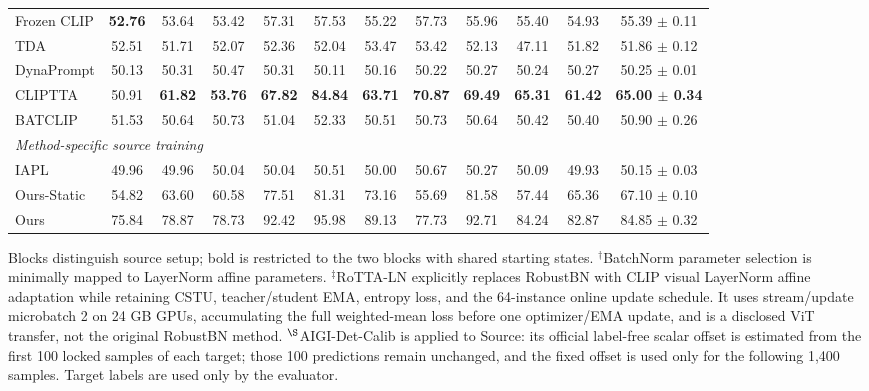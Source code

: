 \begin{table}[t]
{\begin{tabular}{lccccccccccc}
Frozen CLIP & \textbf{52.76} & 53.64 & 53.42 & 57.31 & 57.53 & 55.22 & 57.73 & 55.96 & 55.40 & 54.93 & 55.39 $\pm$ 0.11 \\
TDA & 52.51 & 51.71 & 52.07 & 52.36 & 52.04 & 53.47 & 53.42 & 52.13 & 47.11 & 51.82 & 51.86 $\pm$ 0.12 \\
DynaPrompt & 50.13 & 50.31 & 50.47 & 50.31 & 50.11 & 50.16 & 50.22 & 50.27 & 50.24 & 50.27 & 50.25 $\pm$ 0.01 \\
CLIPTTA & 50.91 & \textbf{61.82} & \textbf{53.76} & \textbf{67.82} & \textbf{84.84} & \textbf{63.71} & \textbf{70.87} & \textbf{69.49} & \textbf{65.31} & \textbf{61.42} & \textbf{65.00 $\pm$ 0.34} \\
BATCLIP & 51.53 & 50.64 & 50.73 & 51.04 & 52.33 & 50.51 & 50.73 & 50.64 & 50.42 & 50.40 & 50.90 $\pm$ 0.26 \\
\midrule
\multicolumn{12}{l}{\textit{Method-specific source training}} \\
IAPL & 49.96 & 49.96 & 50.04 & 50.04 & 50.51 & 50.00 & 50.67 & 50.27 & 50.09 & 49.93 & 50.15 $\pm$ 0.03 \\
Ours-Static & 54.82 & 63.60 & 60.58 & 77.51 & 81.31 & 73.16 & 55.69 & 81.58 & 57.44 & 65.36 & 67.10 $\pm$ 0.10 \\
Ours & 75.84 & 78.87 & 78.73 & 92.42 & 95.98 & 89.13 & 77.73 & 92.71 & 84.24 & 82.87 & 84.85 $\pm$ 0.32 \\
\bottomrule
\end{tabular}%
}
\vspace{2pt}
\parbox{\textwidth}{\footnotesize Blocks distinguish source setup; bold is restricted to the two blocks with shared starting states. $^{\dagger}$BatchNorm parameter selection is minimally mapped to LayerNorm affine parameters. $^{\ddagger}$RoTTA-LN explicitly replaces RobustBN with CLIP visual LayerNorm affine adaptation while retaining CSTU, teacher/student EMA, entropy loss, and the 64-instance online update schedule. It uses stream/update microbatch 2 on 24 GB GPUs, accumulating the full weighted-mean loss before one optimizer/EMA update, and is a disclosed ViT transfer, not the original RobustBN method. $^{\S}$AIGI-Det-Calib is applied to Source: its official label-free scalar offset is estimated from the first 100 locked samples of each target; those 100 predictions remain unchanged, and the fixed offset is used only for the following 1,400 samples. Target labels are used only by the evaluator.}
\end{table}
